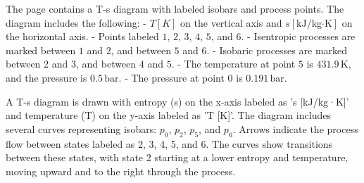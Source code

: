 The page contains a T-s diagram with labeled isobars and process points. The diagram includes the following:  
- \( T[K] \) on the vertical axis and \( s[\text{kJ/kg·K}] \) on the horizontal axis.  
- Points labeled \( 1 \), \( 2 \), \( 3 \), \( 4 \), \( 5 \), and \( 6 \).  
- Isentropic processes are marked between \( 1 \) and \( 2 \), and between \( 5 \) and \( 6 \).  
- Isobaric processes are marked between \( 2 \) and \( 3 \), and between \( 4 \) and \( 5 \).  
- The temperature at point \( 5 \) is \( 431.9 \, \text{K} \), and the pressure is \( 0.5 \, \text{bar} \).  
- The pressure at point \( 0 \) is \( 0.191 \, \text{bar} \).

A T-s diagram is drawn with entropy (s) on the x-axis labeled as 's [kJ/kg·K]' and temperature (T) on the y-axis labeled as 'T [K]'. The diagram includes several curves representing isobars: \( p_0 \), \( p_2 \), \( p_5 \), and \( p_6 \). Arrows indicate the process flow between states labeled as 2, 3, 4, 5, and 6. The curves show transitions between these states, with state 2 starting at a lower entropy and temperature, moving upward and to the right through the process.